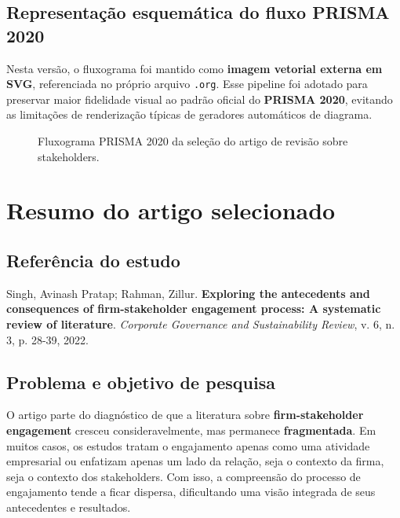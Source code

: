 \documentclass[12pt]{article}
\begin{document}
\clearpage

\subsection{Representação esquemática do fluxo PRISMA 2020}
\label{sec:orgdd2a3cb}

Nesta versão, o fluxograma foi mantido como \textbf{imagem vetorial externa em SVG}, referenciada no próprio arquivo \texttt{.org}. Esse pipeline foi adotado para preservar maior fidelidade visual ao padrão oficial do \textbf{PRISMA 2020}, evitando as limitações de renderização típicas de geradores automáticos de diagrama.

\begin{figure}[H]
\centering

\caption{Fluxograma PRISMA 2020 da seleção do artigo de revisão sobre stakeholders.}
\label{fig:prisma2020_stakeholders_fluxo}
\end{figure}

\section{Resumo do artigo selecionado}
\label{sec:orgc9a0a3d}

\subsection{Referência do estudo}
\label{sec:org0e0df43}

Singh, Avinash Pratap; Rahman, Zillur. \textbf{Exploring the antecedents and consequences of firm-stakeholder engagement process: A systematic review of literature}. \emph{Corporate Governance and Sustainability Review}, v. 6, n. 3, p. 28-39, 2022.

\subsection{Problema e objetivo de pesquisa}
\label{sec:org2e28fe5}

O artigo parte do diagnóstico de que a literatura sobre \textbf{firm-stakeholder engagement} cresceu consideravelmente, mas permanece \textbf{fragmentada}. Em muitos casos, os estudos tratam o engajamento apenas como uma atividade empresarial ou enfatizam apenas um lado da relação, seja o contexto da firma, seja o contexto dos stakeholders. Com isso, a compreensão do processo de engajamento tende a ficar dispersa, dificultando uma visão integrada de seus antecedentes e resultados.
\end{document}
